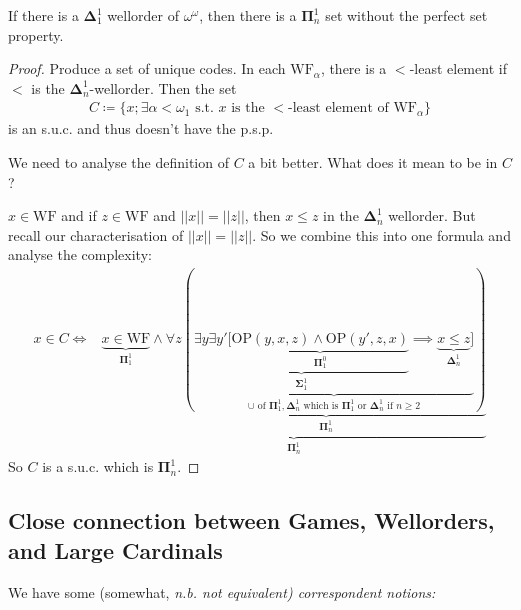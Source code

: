 \documentclass[]{article}
\newcommand{\om}{\omega}
\newcommand{\bosig}{\bm{\Sigma}}
\newcommand{\bopi}{\bm{\Pi}}
\newcommand{\bodel}{\bm{\Delta}}
\newcommand{\wf}{\textrm{WF}}
\newcommand{\op}{\textrm{OP}}
\begin{document}
\begin{theorem*}
    If there is a $\bodel^1_1$ wellorder of $\om^\om$, then there is a $\bopi^1_n$ set without the perfect set property.
\end{theorem*}
\begin{proof}
    Produce a set of unique codes. In each $\wf_\alpha$, there is a $<$-least element if $<$ is the $\bodel^1_n$-wellorder. Then the set
    \begin{align*}
        C\coloneqq \{x;\exists \alpha < \om_1 \textrm{ s.t. }x\textrm{ is the }<\textrm{-least element of }\wf_\alpha\}
    \end{align*}
    is an s.u.c. and thus doesn't have the p.s.p.

    We need to analyse the definition of $C$ a bit better. What does it mean to be in $C$?

    $x \in \wf$ and if $z \in \wf$ and $||x|| = ||z||$, then $x\le z$ in the $\bodel^1_n$ wellorder. But recall our characterisation of $||x|| = ||z||$. So we combine this into one formula and analyse the complexity:
    \begin{align*}
        x \in C \iff & \underbrace{\underbrace{x \in \wf}_{\bopi^1_1} \land \underbrace{\forall z (\underbrace{\underbrace{\exists y\exists y' [\underbrace{\op(y,x,z)\land\op(y',z,x)}_{\bopi^0_1}}_{\bosig^1_1}\implies \underbrace{x\le z}_{\bodel^1_n}]}_{\cup \textrm{ of } \bopi^1_1,\bodel^1_n\textrm{ which is }\bopi^1_1\textrm{ or }\bodel^1_n\textrm{ if }n\ge2})}_{\bopi^1_n}}_{\bopi^1_n}
    \end{align*}
    So $C$ is a s.u.c. which is $\bopi^1_n$.
\end{proof}

\subsection*{Close connection between Games, Wellorders, and Large Cardinals}
We have some (somewhat, \it{n.b.} not equivalent) correspondent notions:
\end{document}
